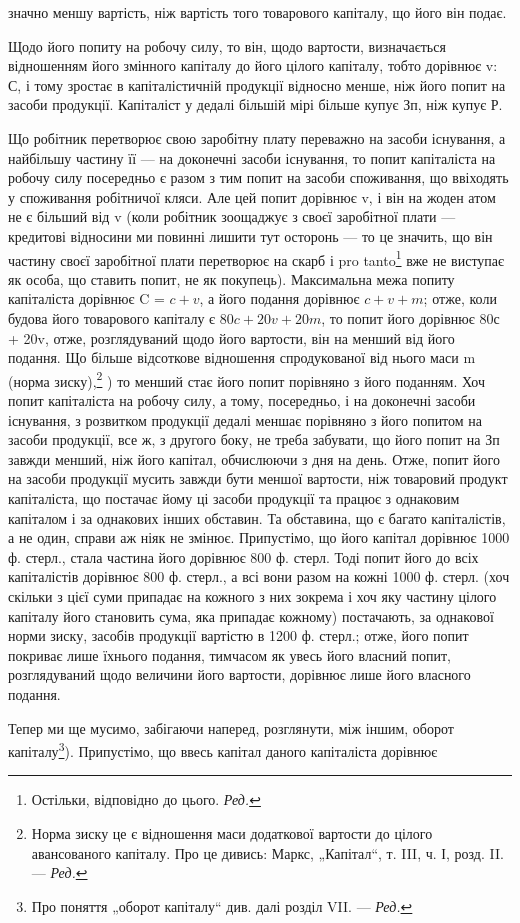 \parcont{}  %
значно меншу вартість, ніж вартість того товарового капіталу, що
його він подає.

Щодо його попиту на робочу силу, то він, щодо вартости, визначається
відношенням його змінного капіталу до його цілого капіталу,
тобто дорівнює v: С, і тому зростає в капіталістичній продукції
відносно менше, ніж його попит на засоби продукції. Капіталіст
у дедалі більшій мірі більше купує Зп, ніж купує Р.

Що робітник перетворює свою заробітну плату переважно на засоби
існування, а найбільшу частину її — на доконечні засоби існування, то попит
капіталіста на робочу силу посередньо є разом з тим попит на засоби споживання,
що ввіходять у споживання робітничої кляси. Але цей попит
дорівнює v, і він на жоден атом не є більший від v (коли робітник зоощаджує
з своєї заробітної плати — кредитові відносини ми повинні лишити
тут осторонь — то це значить, що він частину своєї заробітної плати
перетворює на скарб і pro tanto\footnote*{
Остільки, відповідно до цього. \emph{Ред.}
} вже не виступає як особа, що ставить
попит, не як покупець). Максимальна межа попиту капіталіста дорівнює
C = $c + v$, а його подання дорівнює $c + v + m$; отже, коли будова
його товарового капіталу є $80c + 20v + 20m$, то попит його дорівнює
80с + 20v, отже, розглядуваний щодо його вартости, він на  менший
від його подання. Що більше відсоткове відношення спродукованої від нього
маси m (норма зиску),\footnote*{Норма зиску це є відношення маси додаткової вартости до цілого авансованого
капіталу. Про це дивись: Маркс, „Капітал“, т. III, ч. І, розд. II. —
\emph{Ред.}}
) то менший стає його попит порівняно з його
поданням. Хоч попит капіталіста на робочу силу, а тому, посередньо, і
на доконечні засоби існування, з розвитком продукції дедалі меншає порівняно
з його попитом на засоби продукції, все ж, з другого боку, не
треба забувати, що його попит на Зп завжди менший, ніж його капітал,
обчислюючи з дня на день. Отже, попит його на засоби продукції
мусить завжди бути меншої вартости, ніж товаровий продукт капіталіста,
що постачає йому ці засоби продукції та працює з однаковим
капіталом і за однакових інших обставин. Та обставина, що є
багато капіталістів, а не один, справи аж ніяк не змінює. Припустімо,
що його капітал дорівнює 1000 ф. стерл., стала частина його дорівнює
800 ф. стерл. Тоді попит його до всіх капіталістів дорівнює 800 ф. стерл.,
а всі вони разом на кожні 1000 ф. стерл. (хоч скільки з цієї суми припадає
на кожного з них зокрема і хоч яку частину цілого капіталу його
становить сума, яка припадає кожному) постачають, за однакової норми
зиску, засобів продукції вартістю в 1200 ф. стерл.; отже, його попит покриває
лише  їхнього подання, тимчасом як увесь його власний попит,
розглядуваний щодо величини його вартости, дорівнює лише 
його власного подання.

Тепер ми ще мусимо, забігаючи наперед, розглянути, між іншим, оборот
капіталу\footnote*{Про поняття „оборот капіталу“ див. далі розділ VII. — \emph{Ред.}}). Припустімо, що ввесь капітал даного капіталіста дорівнює
\parbreak{}  %
